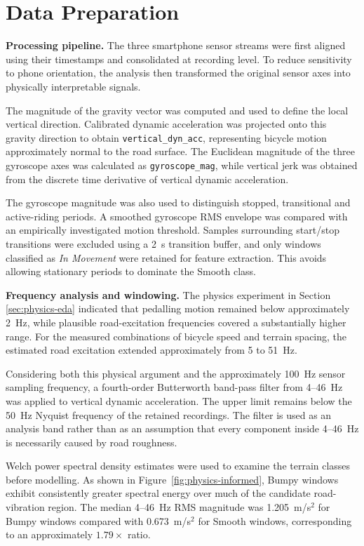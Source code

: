 \section{Data Preparation}
\label{sec:data-preparation}


\textbf{Processing pipeline.}
The three smartphone sensor streams were first aligned using their timestamps
and consolidated at recording level. To reduce sensitivity to phone
orientation, the analysis then transformed the original sensor axes into
physically interpretable signals.

The magnitude of the gravity vector was computed and used to define the local
vertical direction. Calibrated dynamic acceleration was projected onto this
gravity direction to obtain \texttt{vertical\_dyn\_acc}, representing bicycle
motion approximately normal to the road surface. The Euclidean magnitude of
the three gyroscope axes was calculated as \texttt{gyroscope\_mag}, while
vertical jerk was obtained from the discrete time derivative of vertical
dynamic acceleration.

The gyroscope magnitude was also used to distinguish stopped, transitional
and active-riding periods. A smoothed gyroscope RMS envelope was compared
with an empirically investigated motion threshold. Samples surrounding
start/stop transitions were excluded using a 2~s transition buffer, and only
windows classified as \textit{In Movement} were retained for feature
extraction. This avoids allowing stationary periods to dominate the
Smooth class.

\textbf{Frequency analysis and windowing.}
The physics experiment in Section \ref{sec:physics-eda} indicated that pedalling motion remained
below approximately 2~Hz, while plausible road-excitation frequencies covered
a substantially higher range. For the measured combinations of bicycle speed
and terrain spacing, the estimated road excitation extended approximately
from 5 to 51~Hz.

Considering both this physical argument and the approximately 100~Hz sensor
sampling frequency, a fourth-order Butterworth band-pass filter from
4--46~Hz was applied to vertical dynamic acceleration. The upper limit remains
below the 50~Hz Nyquist frequency of the retained recordings. The filter is
used as an analysis band rather than as an assumption that every component
inside 4--46~Hz is necessarily caused by road roughness.

Welch power spectral density estimates were used to examine the terrain
classes before modelling. As shown in Figure~\ref{fig:physics-informed},
Bumpy windows exhibit consistently greater spectral energy over much of the
candidate road-vibration region. The median 4--46~Hz RMS magnitude was
1.205~m/s$^2$ for Bumpy windows compared with 0.673~m/s$^2$ for Smooth
windows, corresponding to an approximately $1.79\times$ ratio.

